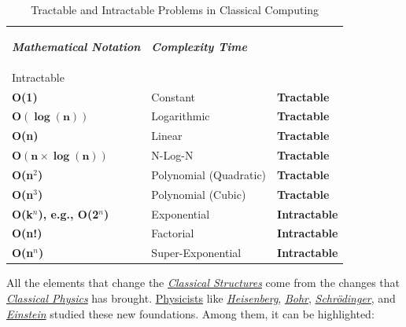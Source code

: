 \documentclass[conference]{IEEEtran}
\begin{document}
\begin{table}[!hp]
\centering
    \caption{Tractable and Intractable Problems in Classical Computing}
    \begin{tabular}{ |p{2.2cm}|p{3cm}|p{2.2cm}| }
     \hline
     \begin{center}\textbf{\textit{Mathematical Notation}}\end{center} & \begin{center}\textbf{\textit{Complexity Time}}\end{center} & \begin{center}\textbf{\textit{Tractable/\\Intractable}}\end{center}\\
     \hline
     \hline
     \textbf{O(1)} & Constant & \textbf{Tractable} \\
     \hline
     $\bm{O(\log(n))}$ & Logarithmic & \textbf{Tractable} \\
     \hline
     \textbf{O(n)} & Linear & \textbf{Tractable} \\
     \hline
     $\bm{O(n\times\log(n))}$ & N-Log-N & \textbf{Tractable} \\
     \hline
     \textbf{O(n$^{2}$)} & Polynomial (Quadratic) & \textbf{Tractable} \\
     \hline
     \textbf{O(n$^{3}$)} & Polynomial (Cubic) & \textbf{Tractable} \\
     \hline
     \hline
     \textbf{O(k$^{n}$), e.g., O(2$^{n}$)} & Exponential & \textbf{Intractable} \\
     \hline
     \textbf{O(n!)} & Factorial & \textbf{Intractable} \\
     \hline
     \textbf{O(n$^{n}$)} & Super-Exponential & \textbf{Intractable} \\
     \hline
    \end{tabular}
\end{table}


\newpage

All the elements that change the \href{https://en.wikipedia.org/wiki/Structure_and_Interpretation_of_Classical_Mechanics}{\textit{Classical Structures}} come from the changes that \href{https://en.wikipedia.org/wiki/Classical_physics}{\textit{Classical Physics}} has brought. \href{https://en.wikipedia.org/wiki/Physicist}{Physicists} like \href{https://en.wikipedia.org/wiki/Werner_Heisenberg}{\textit{Heisenberg}}, \href{https://en.wikipedia.org/wiki/Niels_Bohr}{\textit{Bohr}}, \href{https://en.wikipedia.org/wiki/Erwin_Schr\%C3\%B6dinger}{\textit{Schr\"odinger}}, and \href{https://en.wikipedia.org/wiki/Albert_Einstein}{\textit{Einstein}} studied these new foundations. Among them, it can be highlighted:
\end{document}
